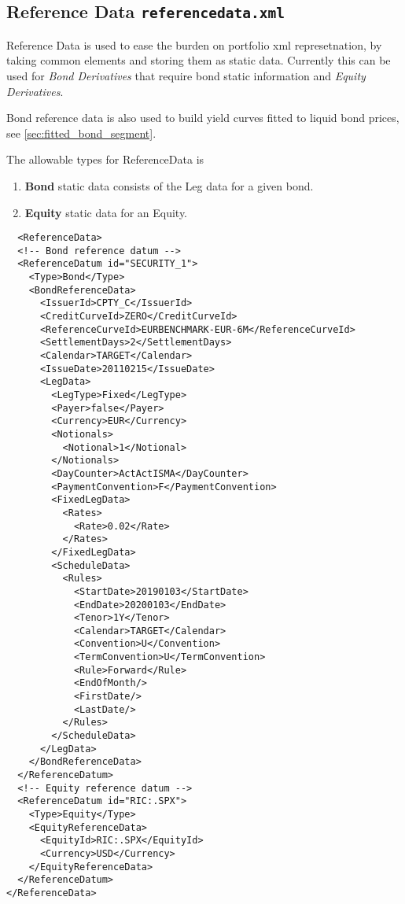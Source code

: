 \subsection{Reference Data {\tt referencedata.xml}}
\label{sec:referencedata}

Reference Data is used to ease the burden on portfolio xml represetnation, by taking common elements and storing them as
static data. Currently this can be used for \textit{Bond Derivatives} that require bond static information and
\textit{Equity Derivatives}.

Bond reference data is also used to build yield curves fitted to liquid bond prices, see \ref{sec:fitted_bond_segment}.

The allowable types for ReferenceData is
\begin{enumerate}
\item \textbf{Bond} static data consists of the Leg data for a given bond.
\item \textbf{Equity} static data for an Equity.
\end{enumerate}

\begin{verbatim}
  <ReferenceData>
  <!-- Bond reference datum -->
  <ReferenceDatum id="SECURITY_1">
    <Type>Bond</Type>
    <BondReferenceData>
      <IssuerId>CPTY_C</IssuerId>
      <CreditCurveId>ZERO</CreditCurveId>
      <ReferenceCurveId>EURBENCHMARK-EUR-6M</ReferenceCurveId>
      <SettlementDays>2</SettlementDays>
      <Calendar>TARGET</Calendar>
      <IssueDate>20110215</IssueDate>
      <LegData>
        <LegType>Fixed</LegType>
        <Payer>false</Payer>
        <Currency>EUR</Currency>
        <Notionals>
          <Notional>1</Notional>
        </Notionals>
        <DayCounter>ActActISMA</DayCounter>
        <PaymentConvention>F</PaymentConvention>
        <FixedLegData>
          <Rates>
            <Rate>0.02</Rate>
          </Rates>
        </FixedLegData>
        <ScheduleData>
          <Rules>
            <StartDate>20190103</StartDate>
            <EndDate>20200103</EndDate>
            <Tenor>1Y</Tenor>
            <Calendar>TARGET</Calendar>
            <Convention>U</Convention>
            <TermConvention>U</TermConvention>
            <Rule>Forward</Rule>
            <EndOfMonth/>
            <FirstDate/>
            <LastDate/>
          </Rules>
        </ScheduleData>
      </LegData>
    </BondReferenceData>
  </ReferenceDatum>
  <!-- Equity reference datum -->
  <ReferenceDatum id="RIC:.SPX">
    <Type>Equity</Type>
    <EquityReferenceData>
      <EquityId>RIC:.SPX</EquityId>
      <Currency>USD</Currency>
    </EquityReferenceData>
  </ReferenceDatum>
</ReferenceData>
\end{verbatim}
